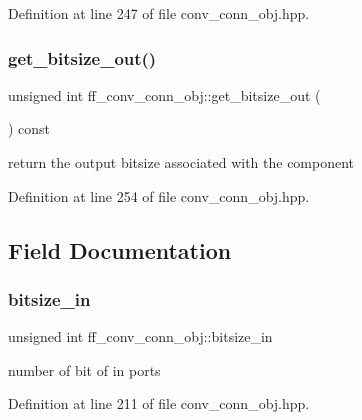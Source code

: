 Definition at line 247 of file conv\+\_\+conn\+\_\+obj.\+hpp.

\mbox{\label{classff__conv__conn__obj_a105bbece599841f31c17871d0a738fc5}} 
\subsubsection{\texorpdfstring{get\+\_\+bitsize\+\_\+out()}{get\_bitsize\_out()}}
{\footnotesize\ttfamily unsigned int ff\+\_\+conv\+\_\+conn\+\_\+obj\+::get\+\_\+bitsize\+\_\+out (\begin{DoxyParamCaption}{ }\end{DoxyParamCaption}) const\hspace{0.3cm}{\ttfamily [inline]}}



return the output bitsize associated with the component 



Definition at line 254 of file conv\+\_\+conn\+\_\+obj.\+hpp.



\subsection{Field Documentation}
\mbox{\label{classff__conv__conn__obj_a9780825ecb93883761060fd22883d032}} 
\subsubsection{\texorpdfstring{bitsize\+\_\+in}{bitsize\_in}}
{\footnotesize\ttfamily unsigned int ff\+\_\+conv\+\_\+conn\+\_\+obj\+::bitsize\+\_\+in\hspace{0.3cm}{\ttfamily [private]}}



number of bit of in ports 



Definition at line 211 of file conv\+\_\+conn\+\_\+obj.\+hpp.

